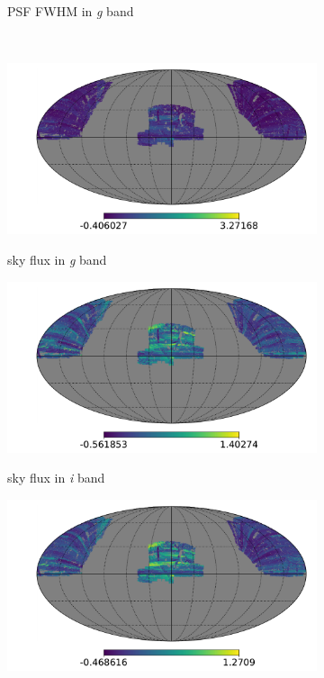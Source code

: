 \begin{figure}
\begin{subfigure}{.33\textwidth}
	\label{fig:systmap6}
    \caption{PSF FWHM in \textit{g} band}
\end{subfigure}
\\
\begin{subfigure}{.33\textwidth}
  \centering
    \includegraphics[scale=0.214]{SystematicMaps2/map_sdss_dr12_systematics_skyfluxg.pdf}
    \label{fig:systmap7}
    \caption{sky flux in \textit{g} band}
\end{subfigure}
\begin{subfigure}{.33\textwidth}
  \centering
    \includegraphics[scale=0.214]{SystematicMaps2/map_sdss_dr12_systematics_skyfluxi.pdf}
    \label{fig:systmap8}
    \caption{sky flux in \textit{i} band}
\end{subfigure}
\begin{subfigure}{.33\textwidth}
  \centering
\includegraphics[scale=0.214]{SystematicMaps2/map_sdss_dr12_systematics_skyfluxr.pdf}

\end{subfigure}
\end{figure}
